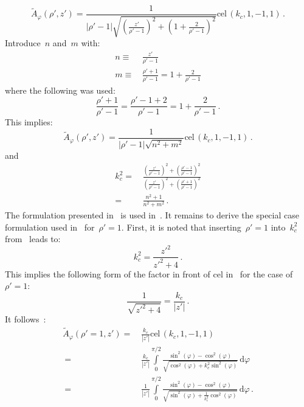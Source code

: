 \begin{equation}
 \tilde{A}_\varphi(\rho',z')
 = \frac{1}{|\rho'-1| \sqrt{\left(\frac{z'}{\rho'-1}\right)^2 + \left(1 + \frac{2}{\rho'-1}\right)^2}}
   \textrm{cel}\,(k_c, 1, -1, 1) \label{eqn:cwl_A_phi_near} \, .
\end{equation}
Introduce~$n$ and~$m$ with:
\begin{align}
  n \equiv&\, \frac{z'}{\rho'-1} \\
  m \equiv&\, \frac{\rho' + 1}{\rho'-1}
    = 1 + \frac{2}{\rho' - 1}
\end{align}
where the following was used:
\begin{equation}
    \frac{\rho' + 1}{\rho' - 1}
  = \frac{\rho'-1 + 2}{\rho' - 1}
  = 1 + \frac{2}{\rho' - 1} \, .
\end{equation}
This implies:
\begin{equation}
 \tilde{A}_\varphi(\rho',z')
 = \frac{1}{|\rho'-1| \sqrt{n^2 + m^2}} \textrm{cel}\,(k_c, 1, -1, 1) \, .
\end{equation}
and
\begin{align}
  k_c^2
 =&\, \frac{\left(\frac{z'}{\rho'-1}\right)^2 + \left( \frac{\rho' - 1}{\rho'-1} \right)^2}
           {\left(\frac{z'}{\rho'-1}\right)^2 + \left( \frac{\rho' + 1}{\rho'-1} \right)^2} \nonumber \\
 =&\, \frac{n^2 + 1}
           {n^2 + m^2} \, . \label{eqn:cwl_kCSq_mn}
\end{align}
The formulation presented in~ is used in~.
It remains to derive the special case formulation used in~ for~$\rho'=1$.
First, it is noted that inserting~$\rho'=1$ into~$k_c^2$ from~ leads to:
\begin{equation}
  k_c^2 = \frac{z'^2}{z'^2 + 4} \, .
\end{equation}
This implies the following form of the factor in front of cel in~
for the case of~$\rho'=1$:
\begin{equation}
  \frac{1}{\sqrt{z'^2 + 4}} = \frac{k_c}{|z'|} \, .
\end{equation}
It follows~\cite{bulirsch_3}:
\begin{align}
  \tilde{A}_\varphi(\rho'=1,z') =&\, \frac{k_c}{|z'|} \textrm{cel}\,(k_c, 1, -1, 1) \nonumber \\
  ~ =&\, \frac{k_c}{|z'|} \int\limits_0^{\pi/2} \frac{\sin^2(\varphi) - \cos^2(\varphi)}{\sqrt{\cos^2(\varphi) + k_c^2 \sin^2(\varphi)}} \,\mathrm{d}\varphi \nonumber \\
  ~ =&\,   \frac{1}{|z'|} \int\limits_0^{\pi/2} \frac{\sin^2(\varphi) - \cos^2(\varphi)}{\sqrt{\sin^2(\varphi) + \frac{1}{k_c^2} \cos^2(\varphi)}} \,\mathrm{d}\varphi \, .
\end{align}
